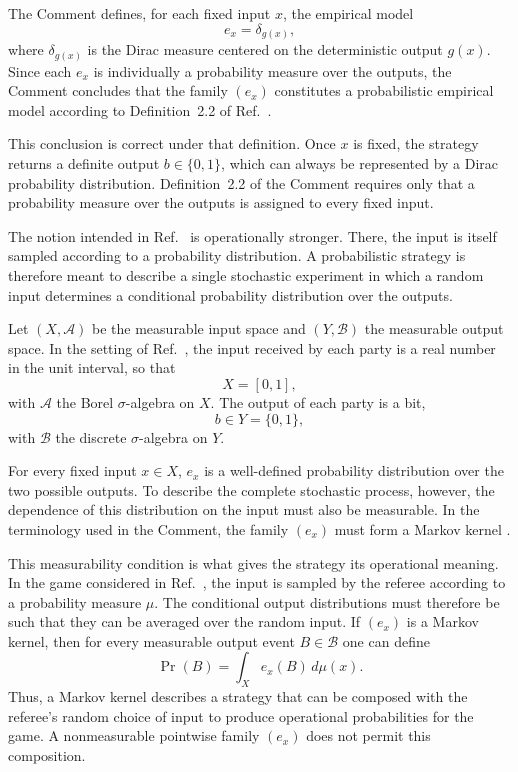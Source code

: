 \documentclass[aps,prl,twocolumn,superscriptaddress]{revtex4-2}
\begin{document}
The Comment defines, for each fixed input $x$, the empirical model
\begin{equation}
e_x=\delta_{g(x)},
\end{equation}
where $\delta_{g(x)}$ is the Dirac measure centered on the
deterministic output $g(x)$. Since each $e_x$ is individually a
probability measure over the outputs, the Comment concludes that
the family $(e_x)$ constitutes a probabilistic empirical model
according to Definition~2.2 of
Ref.~\cite{karvonen2026comment}.

This conclusion is correct under that definition. Once $x$ is
fixed, the strategy returns a definite output
$b\in\{0,1\}$, which can always be represented by a Dirac
probability distribution. Definition~2.2 of the Comment requires
only that a probability measure over the outputs is assigned to
every fixed input.

The notion intended in Ref.~\cite{baumeler2025axiom} is
operationally stronger. There, the input is itself sampled
according to a probability distribution. A probabilistic
strategy is therefore meant to describe a single stochastic
experiment in which a random input determines a conditional
probability distribution over the outputs.

Let $(X,\mathcal A)$ be the measurable input space and
$(Y,\mathcal B)$ the measurable output space. In the setting of
Ref.~\cite{baumeler2025axiom}, the input received by each party is
a real number in the unit interval, so that
\begin{equation}
X=[0,1],
\end{equation}
with $\mathcal A$ the Borel $\sigma$-algebra on $X$. The output
of each party is a bit,
\begin{equation}
b\in Y=\{0,1\},
\end{equation}
with $\mathcal B$ the discrete $\sigma$-algebra on $Y$.

For every fixed input $x\in X$, $e_x$ is a well-defined
probability distribution over the two possible outputs. To
describe the complete stochastic process, however, the
dependence of this distribution on the input must also be
measurable. In the terminology used in the Comment, the family
$(e_x)$ must form a Markov kernel \cite{klenke2008probability}.

This measurability condition is what gives the strategy its
operational meaning. In the game considered in
Ref.~\cite{baumeler2025axiom}, the input is sampled by the referee
according to a probability measure $\mu$. The conditional output
distributions must therefore be such that they can be averaged
over the random input. If $(e_x)$ is a Markov kernel, then for
every measurable output event $B\in\mathcal B$ one can define
\begin{equation}
\Pr(B)=\int_X e_x(B)\,d\mu(x).
\end{equation}
Thus, a Markov kernel describes a strategy that can be composed
with the referee's random choice of input to produce operational
probabilities for the game. A nonmeasurable pointwise family $(e_x)$
does not permit this composition.
\end{document}
